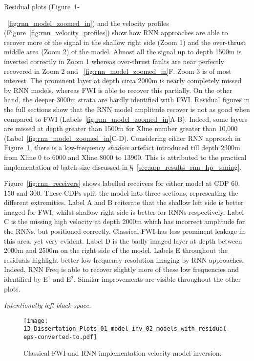 Residual plots (Figure~\ref{fig:rnn_models}-{~\ref{fig:rnn_model_zoomed_in}) and the velocity profiles (Figure~\ref{fig:rnn_velocity_profiles}) show how RNN approaches are able to recover more of the signal in the shallow right side (Zoom 1) and the over-thrust middle area (Zoom 2) of the model. Almost all the signal up to depth 1500m is inverted correctly in Zoom 1 whereas over-thrust faults are near perfectly recovered in Zoom 2 and ~\ref{fig:rnn_model_zoomed_in}F. Zoom 3 is of most interest. The prominent layer at depth circa 2000m is nearly completely missed by RNN models, whereas FWI is able to recover this partially. On the other hand, the deeper 3000m strata are hardly identified with FWI. Residual figures in the full sections show that the RNN model amplitude recover is not as good when compared to FWI (Labels~\ref{fig:rnn_model_zoomed_in}A-B). Indeed, some layers are missed at depth greater than 1500m for Xline number greater than 10,000 (Label~\ref{fig:rnn_model_zoomed_in}C-D). Considering either RNN approach in Figure~\ref{fig:rnn_models}, there is a low-frequency \textit{shadow} artefact introduced till depth 2300m from Xline 0 to 6000 and Xline 8000 to 13900. This is attributed to the practical implementation of batch-size discussed in §~\ref{sec:app_results_rnn_hp_tuning}.

Figure~\ref{fig:rnn_receivers} shows labelled receivers for either model at \ac{CDP} 60, 150 and 300. These CDPs split the model into three sections, representing the different extremities. Label A and B reiterate that the shallow left side is better imaged for FWI, whilst shallow right side is better for RNNs respectively. Label C is the missing high velocity at depth 2000m which has incorrect amplitude for the RNNs, but positioned correctly. Classical FWI has less prominent leakage in this area, yet very evident. Label D is the badly imaged layer at depth between 2000m and 2500m on the right side of the model. Labels E throughout the residuals highlight better low frequency resolution imaging by RNN approaches. Indeed, RNN Freq is able to recover slightly more of these low frequencies and identified by E$^{1}$ and E$^{2}$. Similar improvements are visible throughout the other plots. 

\vspace*{\fill} 
\begin{center}
    \emph{Intentionally left black space.}
\end{center}
\vspace*{\fill}


\begin{figure}[ht!]
    \centering
    \texttt{[image: 13\_Dissertation\_Plots\_01\_model\_inv\_02\_models\_with\_residual-eps-converted-to.pdf]}
    \caption[Classical FWI and RNN implementation velocity model inversion.]{Classical FWI and RNN implementation velocity model inversion.}
    \label{fig:rnn_models}
\end{figure}

}

